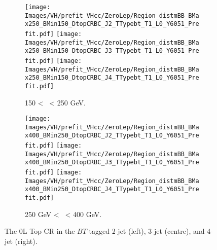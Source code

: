 \begin{figure}[h!]
    \centering
    \begin{subfigure}[b]{\textwidth}
        \centering
        \texttt{[image: Images/VH/prefit\_VHcc/ZeroLep/Region\_distmBB\_BMax250\_BMin150\_DtopCRBC\_J2\_TTypebt\_T1\_L0\_Y6051\_Prefit.pdf]}
        \texttt{[image: Images/VH/prefit\_VHcc/ZeroLep/Region\_distmBB\_BMax250\_BMin150\_DtopCRBC\_J3\_TTypebt\_T1\_L0\_Y6051\_Prefit.pdf]}
        \texttt{[image: Images/VH/prefit\_VHcc/ZeroLep/Region\_distmBB\_BMax250\_BMin150\_DtopCRBC\_J4\_TTypebt\_T1\_L0\_Y6051\_Prefit.pdf]}
        \caption{150 < \ptv\ < 250 GeV.}
        \label{fig:plots_VHcc_OL_150_TopCR_2c}
    \end{subfigure}
    \begin{subfigure}[b]{\textwidth}
        \centering
        \texttt{[image: Images/VH/prefit\_VHcc/ZeroLep/Region\_distmBB\_BMax400\_BMin250\_DtopCRBC\_J2\_TTypebt\_T1\_L0\_Y6051\_Prefit.pdf]}
        \texttt{[image: Images/VH/prefit\_VHcc/ZeroLep/Region\_distmBB\_BMax400\_BMin250\_DtopCRBC\_J3\_TTypebt\_T1\_L0\_Y6051\_Prefit.pdf]}
        \texttt{[image: Images/VH/prefit\_VHcc/ZeroLep/Region\_distmBB\_BMax400\_BMin250\_DtopCRBC\_J4\_TTypebt\_T1\_L0\_Y6051\_Prefit.pdf]}
        \caption{250 GeV < \ptv\ < 400 GeV.}
        \label{fig:plots_VHcc_OL_250_TopCR_2c}
    \end{subfigure}
    \caption{The 0L Top CR in the $BT$-tagged 2-jet (left), 3-jet (centre), and 4-jet (right).}
    \label{fig:plots_VHcc_OL_TopCR_2c}
\end{figure} 

\vspace*{\fill} \newpage
\vspace*{\fill} 

